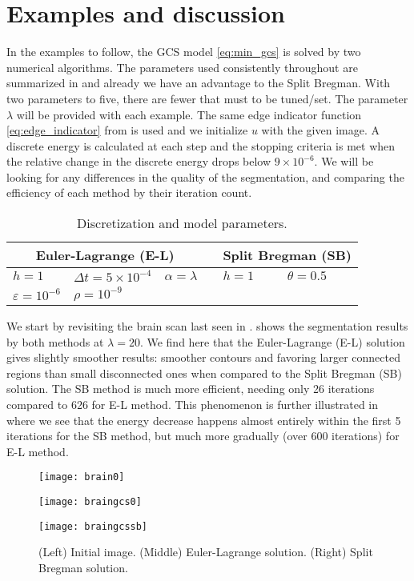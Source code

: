 \section{Examples and discussion}
In the examples to follow, the GCS model \eqref{eq:min_gcs} is solved by two numerical algorithms. The parameters used consistently throughout are summarized in  and already we have an advantage to the Split Bregman. With two parameters to five, there are fewer that must to be tuned/set. The parameter $\lambda$ will be provided with each example. The same edge indicator function \eqref{eq:edge_indicator} from  is used and we initialize $u$ with the given image. A discrete energy is calculated at each step and the stopping criteria is met when the relative change in the discrete energy drops below $9\times 10^{-6}$. We will be looking for any differences in the quality of the segmentation, and comparing the efficiency of each method by their iteration count.

\begin{table}[htb!]
	\caption[]{Discretization and model parameters.}
	\centering
	\begin{tabular}{lll c ll} \toprule[1.25pt]
		\multicolumn{3}{c}{Euler-Lagrange (E-L)} & \phantom{abc} & \multicolumn{2}{c}{Split Bregman (SB)}
		\\ \midrule
		$h = 1$ & $\Delta t = 5\times 10^{-4}$ & $\alpha = \lambda$ & & $h = 1$ & $\theta = 0.5$
		\\
		$\varepsilon=10^{-6}$ & $\rho = 10^{-9}$
		\\ \bottomrule[1.25pt]
	\end{tabular}
	\label{tab:model parameters}
\end{table}

We start by revisiting the brain scan last seen in .  shows the segmentation results by both methods at $\lambda = 20$. We find here that the Euler-Lagrange (E-L) solution gives slightly smoother results: smoother contours and favoring larger connected regions than small disconnected ones when compared to the Split Bregman (SB) solution. The SB method is much more efficient, needing only 26 iterations compared to 626 for E-L method. This phenomenon is further illustrated in  where we see that the energy decrease happens almost entirely within the first 5 iterations for the SB method, but much more gradually (over 600 iterations) for E-L method.
\begin{figure}[htb!]
	\centering
	\begin{minipage}{0.31\textwidth}
		\texttt{[image: brain0]}
	\end{minipage}%
	\begin{minipage}{0.31\textwidth}
		\texttt{[image: braingcs0]}
	\end{minipage}%
	\begin{minipage}{0.31\textwidth}
		\texttt{[image: braingcssb]}
	\end{minipage}
	\caption{(Left) Initial image. (Middle) Euler-Lagrange solution. (Right) Split Bregman solution.}
	\label{fig:brain_gcs}
\end{figure}

